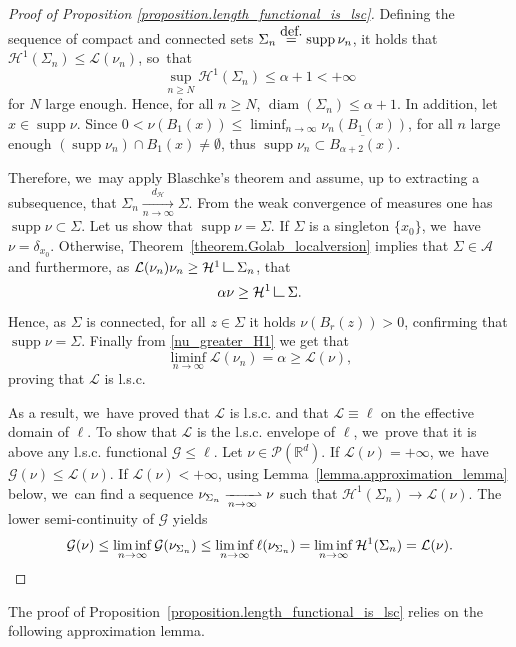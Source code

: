 \documentclass[11pt]{article}
\numberwithin{equation}{section}
\theoremstyle{definition}
\newcommand{\eqdef}{\ensuremath{\stackrel{\mbox{\upshape\tiny def.}}{=}}}
\newcommand\LM[1]{\hbox{\vrule width.5pt \vbox to#1pt{\vfill \hrule width#1pt height.5pt}}}
\newcommand\LL{{\mathchoice {\>\LM7\>}{\>\LM7\>}{\,\LM5\,}{\,\LM{3.35}\,}}}
\newcommand{\mres}{\LL}
\newcommand\G{\mathcal{G}}
\newcommand\cH{\mathcal{H}}
\newcommand{\RR}{\mathbb{R}}
\DeclareMathOperator{\diam}{diam}
\DeclareMathOperator{\supp}{supp}
\newcommand{\distH}{d_{\mathcal{H}}}
\begin{document}
\begin{proof}[Proof of Proposition \ref{proposition.length_functional_is_lsc}]
Defining the sequence of compact and connected sets $\Sigma_n \eqdef \supp \nu_n$, it holds that $\cH^1(\Sigma_n) \le \mathcal{L}(\nu_n)$, so~that
\[
\sup_{n\geq N} \cH^1(\Sigma_n) \leq \alpha +1 <+\infty
\]
for $N$ large enough. Hence, for all $n\ge N$, $\diam(\Sigma_n)\leq \alpha +1$. In addition, let $x\in \supp \nu$. Since $0<\nu(B_1(x))\leq \liminf_{n\to \infty}\nu_n(B_1(x))$, for all $n$ large enough $\left(\supp \nu_n\right)\cap B_1(x)\neq \emptyset$, thus $\supp \nu_n \subset \overline{B_{\alpha+2}(x)}$.

Therefore, we~may apply Blaschke's theorem and assume,
up to extracting a subsequence, that $\Sigma_n \xrightarrow[n \to \infty]{\distH} \Sigma$. From the weak convergence of measures one has $\supp \nu \subset \Sigma$. Let us show that $\supp \nu = \Sigma$. If $\Sigma$ is a singleton $\{x_0\}$, we~have $\nu = \delta_{x_0}$. Otherwise, Theorem~\ref{theorem.Golab_localversion} implies that $\Sigma \in \mathcal{A}$ and furthermore, as $\mathcal{L}(\nu_n) \nu_n \ge \cH^1\mres \Sigma_n$, that
\begin{equation}
\label{nu_greater_H1}
\alpha \nu \ge \cH^1\mres \Sigma.
\end{equation}
Hence, as $\Sigma$ is connected, for all $z \!\in\! \Sigma$ it holds $\nu(B_r(z)) \!>\! 0$, confirming that $\supp \nu \!=\! \Sigma$. Finally from \eqref{nu_greater_H1} we get that
\[
\liminf_{n \to \infty} \mathcal{L}(\nu_n)
=
\alpha
\ge
\mathcal{L}(\nu),
\]
proving that $\mathcal{L}$ is l.s.c.

As a result, we~have proved that $\mathcal{L}$ is l.s.c. and that $\mathcal{L}\equiv \ell$ on the effective domain of $\ell$. To show that $\mathcal{L}$ is the l.s.c. envelope of $\ell$, we~prove that it is above any l.s.c. functional $\G \le \ell$. Let $\nu \in \mathcal{P}(\RR^d)$. If $\mathcal{L}(\nu)=+\infty$, we~have $\G(\nu)\leq \mathcal{L}(\nu)$. If $\mathcal{L}(\nu)<+\infty$, using Lemma~\ref{lemma.approximation_lemma} below, we~can find a sequence $\nu_{\Sigma_n} \xrightharpoonup[n \to \infty]{} \nu$ such that $\cH^1(\Sigma_n) \rightarrow \mathcal{L}(\nu)$. The lower semi-continuity of $\G$ yields
\begin{equation*}
\G(\nu) \le \liminf_{n \to \infty} \G(\nu_{\Sigma_n })
\le \liminf_{n \to \infty} \ell(\nu_{\Sigma_n })
= \liminf_{n \to \infty} \cH^1(\Sigma_n)
= \mathcal{L}(\nu).\qedhere
\end{equation*}
\end{proof}

The proof of Proposition~\ref{proposition.length_functional_is_lsc} relies on the following approximation lemma.
\end{document}
